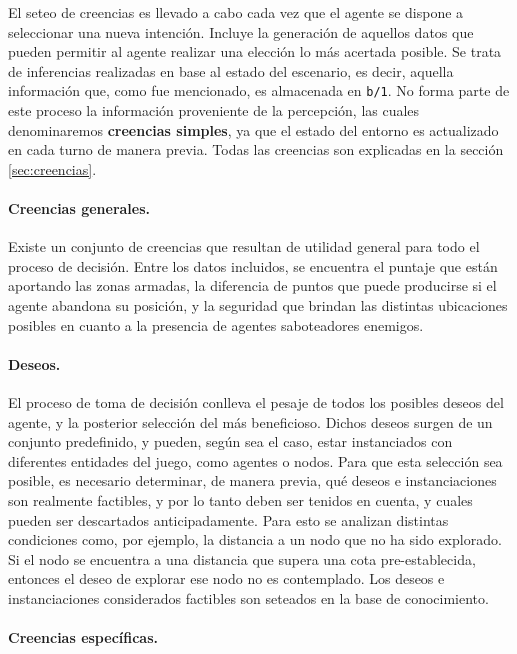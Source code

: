 \documentclass[oneside]{book}
\theoremstyle{definition}
\theoremstyle{example}
\begin{document}
\label{sec:seteoCreencias}

El seteo de creencias es llevado a cabo cada vez que el agente se dispone a 
seleccionar una nueva intención. Incluye la generación de aquellos datos que pueden 
permitir al agente realizar una elección lo más acertada posible. Se trata de 
inferencias realizadas en base al estado del escenario, es decir, aquella información 
que, como fue mencionado, es almacenada en \texttt{b/1}. No forma parte de este proceso 
la información proveniente de la percepción, las cuales denominaremos \textbf{creencias
simples}, ya que el estado del entorno es actualizado 
en cada turno de manera previa. Todas las creencias son explicadas en 
la sección \ref{sec:creencias}.

\paragraph{Creencias generales.}

Existe un conjunto de creencias que resultan de utilidad general para todo el proceso 
de decisión. Entre los datos incluidos, se encuentra el puntaje que están 
aportando las zonas armadas, la diferencia de puntos que puede producirse si el agente 
abandona su posición, y la seguridad que brindan las distintas ubicaciones posibles en 
cuanto a la presencia de agentes saboteadores enemigos. 

\paragraph{Deseos.}

El proceso de toma de decisión conlleva el 
pesaje de todos los posibles deseos del agente, y la posterior selección del más beneficioso. 
Dichos deseos surgen de un conjunto predefinido, y pueden, según sea el caso, estar 
instanciados con diferentes entidades del juego, como agentes o nodos. Para que esta 
selección sea posible, es necesario determinar, de manera previa, qué deseos e instanciaciones 
son realmente factibles, y por lo tanto deben ser tenidos en cuenta, y cuales pueden ser 
descartados anticipadamente.
Para esto se analizan distintas condiciones como, por ejemplo, la distancia a un nodo 
que no ha sido explorado. Si el nodo se encuentra a una distancia que supera una cota 
pre-establecida, entonces el deseo de explorar ese nodo no es contemplado.
Los deseos e instanciaciones considerados factibles son seteados en la base de conocimiento.

\paragraph{Creencias específicas.} %
\end{document}
